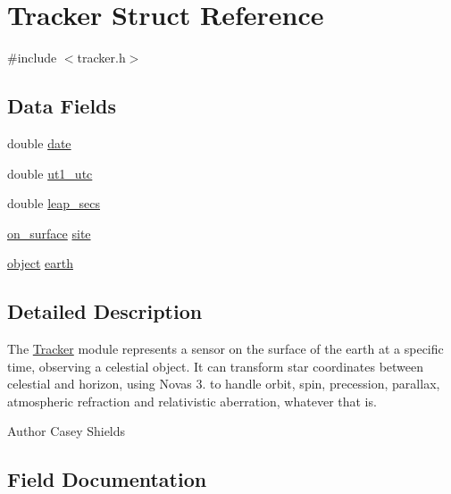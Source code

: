 \hypertarget{struct_tracker}{}\section{Tracker Struct Reference}
\label{struct_tracker}


{\ttfamily \#include $<$tracker.\+h$>$}

\subsection*{Data Fields}
\begin{DoxyCompactItemize}
\item 
double \mbox{\hyperlink{struct_tracker_a6c9423e9bfc2c6dfcbae6c1276e0bfc0}{date}}
\item 
double \mbox{\hyperlink{struct_tracker_a9eef053f0153643589ed50d5f193afe7}{ut1\+\_\+utc}}
\item 
double \mbox{\hyperlink{struct_tracker_ad762d92dc4fcba312c9d2d11ff3a7e67}{leap\+\_\+secs}}
\item 
\mbox{\hyperlink{structon__surface}{on\+\_\+surface}} \mbox{\hyperlink{struct_tracker_afb38e182752f31d6a08f82d960955438}{site}}
\item 
\mbox{\hyperlink{structobject}{object}} \mbox{\hyperlink{struct_tracker_ae1beefa1f286be116b00f0e8ad83d002}{earth}}
\end{DoxyCompactItemize}


\subsection{Detailed Description}
The \mbox{\hyperlink{struct_tracker}{Tracker}} module represents a sensor on the surface of the earth at a specific time, observing a celestial object. It can transform star coordinates between celestial and horizon, using Novas 3. to handle orbit, spin, precession, parallax, atmospheric refraction and relativistic aberration, whatever that is. \begin{DoxyAuthor}{Author}
Casey Shields 
\end{DoxyAuthor}


\subsection{Field Documentation}
\mbox{\label{struct_tracker_a6c9423e9bfc2c6dfcbae6c1276e0bfc0}} 
